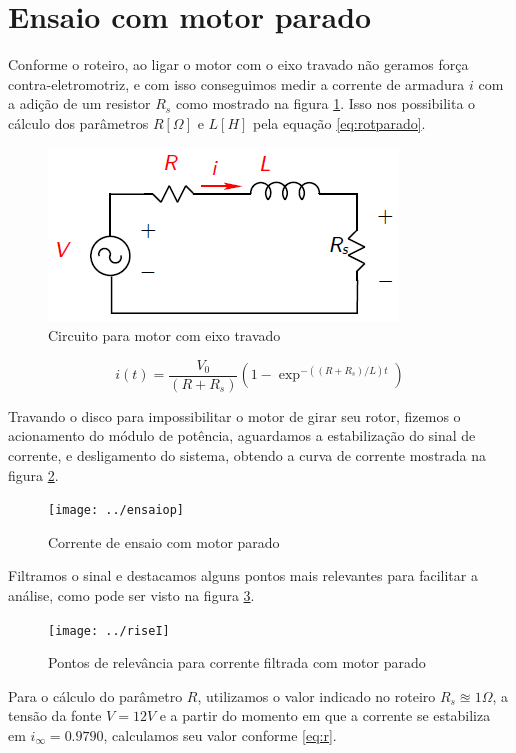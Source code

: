 \documentclass{article}
\begin{document}
\section{Ensaio com motor parado}
Conforme o roteiro\cite{bb:roteiro}, ao ligar o motor com o eixo travado não geramos força contra-eletromotriz, e com isso conseguimos medir a corrente de armadura $i$ com a adição de um resistor $R_s$ como mostrado na figura \ref{fig:rotparado}. Isso nos possibilita o cálculo dos parâmetros $R [\Omega]$ e $L [H]$ pela equação \ref{eq:rotparado}.

\begin{figure}[H]
	\centering
	\includegraphics[width=0.8\linewidth]{rotparado}
	\caption{Circuito para motor com eixo travado}
	\label{fig:rotparado}
\end{figure}

\begin{equation}
\label{eq:rotparado}
i(t) = \frac{V_0}{(R+R_s)}(1-\exp^{-((R+R_s)/L)t})
\end{equation}

Travando o disco para impossibilitar o motor de girar seu rotor, fizemos o acionamento do módulo de potência, aguardamos a estabilização do sinal de corrente, e desligamento do sistema, obtendo a curva de corrente mostrada na figura \ref{fig:ensaiop}.

\begin{figure}[H]
	\centering
	\texttt{[image: ../ensaiop]}
	\caption{Corrente de ensaio com motor parado}
	\label{fig:ensaiop}
\end{figure}

Filtramos o sinal e destacamos alguns pontos mais relevantes para facilitar a análise, como pode ser visto na figura \ref{fig:riseI}.
\begin{figure}[H]
	\centering
	\texttt{[image: ../riseI]}
	\caption{Pontos de relevância para corrente filtrada com motor parado}
	\label{fig:riseI}
\end{figure}

Para o cálculo do parâmetro $R$, utilizamos o valor indicado no roteiro\cite{bb:roteiro} $R_s\approxeq1 \Omega$, a tensão da fonte $V=12 V$ e a partir do momento em que a corrente se estabiliza em $i_\infty=0.9790$, calculamos seu valor conforme \ref{eq:r}.
\end{document}
